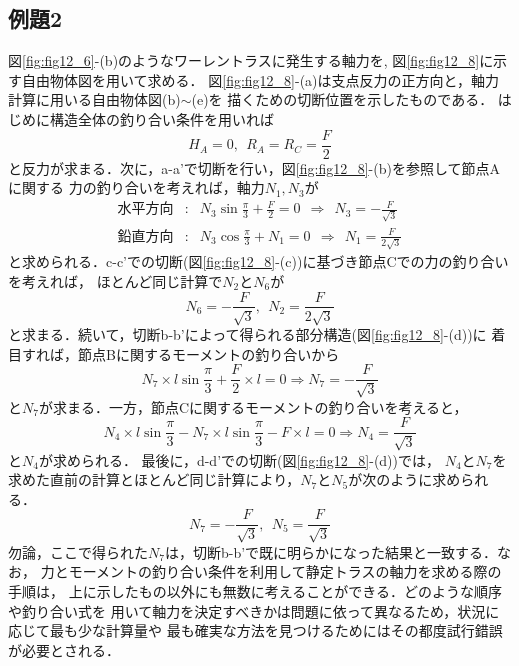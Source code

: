 ﻿\documentclass[10pt,a4j]{jbook}
\begin{document}
\subsection{例題2}
図\ref{fig:fig12_6}-(b)のようなワーレントラスに発生する軸力を, 
図\ref{fig:fig12_8}に示す自由物体図を用いて求める．
図\ref{fig:fig12_8}-(a)は支点反力の正方向と，軸力計算に用いる自由物体図(b)$\sim$(e)を
描くための切断位置を示したものである．
はじめに構造全体の釣り合い条件を用いれば
\begin{equation}
	H_A=0, \ \ R_A=R_C=\frac{F}{2}
\end{equation}
と反力が求まる．次に，a-a'で切断を行い，図\ref{fig:fig12_8}-(b)を参照して節点Aに関する
力の釣り合いを考えれば，軸力$N_1,N_3$が
\begin{eqnarray}
	水平方向&:& N_3\sin\frac{\pi}{3}+\frac{F}{2}=0 
	\ \ 
	\Rightarrow 
	\ \ 
	N_3=-\frac{F}{\sqrt{3}} \\
	鉛直方向&:& N_3\cos\frac{\pi}{3}+N_1=0
	\ \ \Rightarrow   \ \ 
	N_1=\frac{F}{2\sqrt{3}} 
\end{eqnarray}
と求められる．c-c'での切断(図\ref{fig:fig12_8}-(c))に基づき節点Cでの力の釣り合いを考えれば，
ほとんど同じ計算で$N_2$と$N_6$が
\begin{equation}
	N_6=-\frac{F}{\sqrt{3}}, \ \ N_2=\frac{F}{2\sqrt{3}} 
	\label{eqn:}
\end{equation}
と求まる．続いて，切断b-b'によって得られる部分構造(図\ref{fig:fig12_8}-(d))に
着目すれば，節点Bに関するモーメントの釣り合いから
\begin{equation}
	N_7 \times l\sin\frac{\pi}{3}+\frac{F}{2}\times l =0 \Rightarrow 
	N_7=-\frac{F}{\sqrt{3}}
	\label{eqn:N7}
\end{equation}
と$N_7$が求まる．一方，節点Cに関するモーメントの釣り合いを考えると，
\begin{equation}
	N_4 \times l\sin\frac{\pi}{3}- N_7 \times l\sin\frac{\pi}{3} - F\times l =0 \Rightarrow 
	N_4=\frac{F}{\sqrt{3}}
\end{equation}
と$N_4$が求められる．
最後に，d-d'での切断(図\ref{fig:fig12_8}-(d))では，
$N_4$と$N_7$を求めた直前の計算とほとんど同じ計算により，$N_7$と$N_5$が次のように求められる．
\begin{equation}
	N_7=-\frac{F}{\sqrt{3}}
	, \ \ 
	N_5=\frac{F}{\sqrt{3}}
	\label{eqn:}
\end{equation}
勿論，ここで得られた$N_7$は，切断b-b'で既に明らかになった結果と一致する．なお，
力とモーメントの釣り合い条件を利用して静定トラスの軸力を求める際の手順は，
上に示したもの以外にも無数に考えることができる．どのような順序や釣り合い式を
用いて軸力を決定すべきかは問題に依って異なるため，状況に応じて最も少な計算量や
最も確実な方法を見つけるためにはその都度試行錯誤が必要とされる．\\
\end{document}
